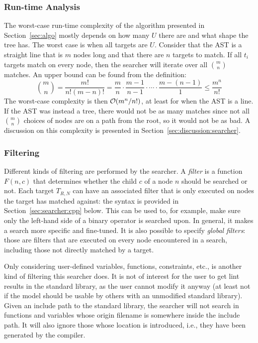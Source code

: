 \documentclass[a4paper,12pt]{article}
\begin{document}
\subsubsection{Run-time Analysis}\label{sec:algo:anal}
The worst-case run-time complexity of the algorithm presented in Section~\ref{sec:algo}
mostly depends on how many $U$ there are and what shape the
tree has. The worst case is when all targets are $U$. %
Consider that the AST is a straight line that is $m$
nodes long and that there are $n$ targets to match. If all $t_i$ targets match on every node, then the
searcher will iterate over all $\binom{m}{n}$ matches. An upper bound can be found from the
definition:
\begin{equation*}
  \binom{m}{n} = \frac{m!}{n! (m-n)!} = \frac{m}{n} \cdot \frac{m-1}{n-1} \cdot \cdots \cdot \frac{m -
    (n-1)}{1} \leq \frac{m^n}{n!}
\end{equation*}%
The worst-case complexity is then $\mathcal{O} ({m^n}/{n!})$, at least for when the AST is a line.
If the AST was instead a tree, there would not be as many matches since not all
$\binom{m}{n}$ choices of nodes are on a path from the root, so it would not be as bad.
A discussion on this complexity is presented in Section~\ref{sec:discussion:searcher}.

\subsubsection{Filtering}\label{sec:filter:stdlib}
Different kinds of filtering are performed by the searcher. A \emph{filter} is a function $F(n,c)$ that
determines whether the child $c$ of a node $n$ should be searched or not.
Each target $T_{R,N}$
can have an associated filter that is
only executed on nodes the target has matched against: the syntax is 
provided in Section~\ref{sec:searcher:cpp} below. This can be used to, for
example, make sure only the left-hand side of a binary operator is searched upon. In
general, it makes a search more specific and fine-tuned.
It is also possible to specify \emph{global filters}: those are filters that are executed on every node
encountered in a search, including those not directly matched by a target.

Only considering user-defined variables, functions, constraints, etc., is another kind of
filtering this searcher does. It is not of interest for the user to get lint results in
the standard library, as the user cannot modify it anyway (at least not if the model should
be usable by others with an unmodified standard library). Given an include path to the
standard library, the searcher will not search in functions and variables whose origin
filename is somewhere inside the include path. It will also ignore those whose location is
introduced, i.e., they have been generated by the compiler.
\end{document}
